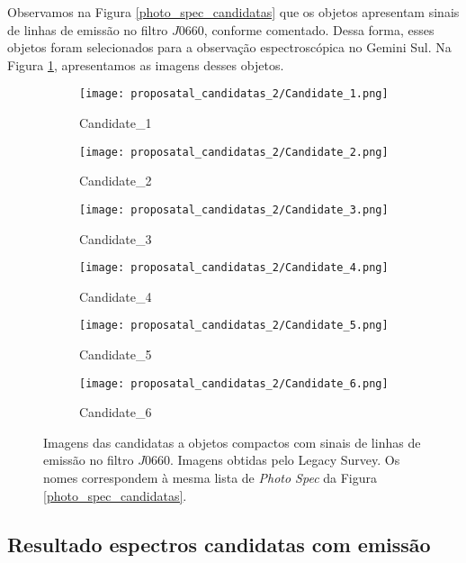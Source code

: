 Observamos na Figura \ref{photo_spec_candidatas} que os objetos apresentam sinais de linhas de emissão no filtro $J0660$, conforme comentado. Dessa forma, esses objetos foram selecionados para a observação espectroscópica no Gemini Sul. Na Figura \ref{candidatas_espectroscopia_2_img}, apresentamos as imagens desses objetos.

\begin{figure}[!ht]
    \centering
    \captionsetup{justification=centering}
    \begin{subfigure}[b]{0.25\textwidth}
        \texttt{[image: proposatal\_candidatas\_2/Candidate\_1.png]}
        \caption{Candidate\_1}
    \end{subfigure}
    \begin{subfigure}[b]{0.25\textwidth}
        \texttt{[image: proposatal\_candidatas\_2/Candidate\_2.png]}
        \caption{Candidate\_2}
    \end{subfigure}
    \begin{subfigure}[b]{0.25\textwidth}
        \texttt{[image: proposatal\_candidatas\_2/Candidate\_3.png]}
        \caption{Candidate\_3}
    \end{subfigure}
    \begin{subfigure}[b]{0.25\textwidth}
        \texttt{[image: proposatal\_candidatas\_2/Candidate\_4.png]}
        \caption{Candidate\_4}
    \end{subfigure}
    \begin{subfigure}[b]{0.25\textwidth}
        \texttt{[image: proposatal\_candidatas\_2/Candidate\_5.png]}
        \caption{Candidate\_5}
    \end{subfigure}
    \begin{subfigure}[b]{0.25\textwidth}
        \texttt{[image: proposatal\_candidatas\_2/Candidate\_6.png]}
        \caption{Candidate\_6}
    \end{subfigure}
    \caption{Imagens das candidatas a objetos compactos com sinais de linhas de emissão no filtro $J0660$. Imagens obtidas pelo Legacy Survey. Os nomes correspondem à mesma lista de \textit{Photo Spec} da Figura \ref{photo_spec_candidatas}.}
    \label{candidatas_espectroscopia_2_img}
\end{figure}

\subsection{Resultado espectros candidatas com emissão}\label{subsection:resultado_espectros_emissao}

